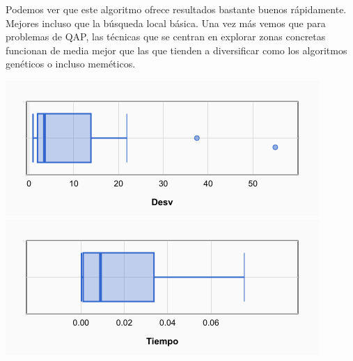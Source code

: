 \documentclass[a4paper, 12pt]{article}
\begin{document}
	Podemos ver que este algoritmo ofrece resultados bastante buenos rápidamente. Mejores incluso que la búsqueda local básica. Una vez más vemos que para problemas de QAP, las técnicas que se centran en explorar zonas concretas funcionan de media mejor que las que tienden a diversificar como los algoritmos genéticos o incluso meméticos.

	\begin{center}
         \includegraphics[scale=0.5]{desv-esCauchy}
         \includegraphics[scale=0.5]{time-esCauchy}
      \end{center}
      
\end{document}
